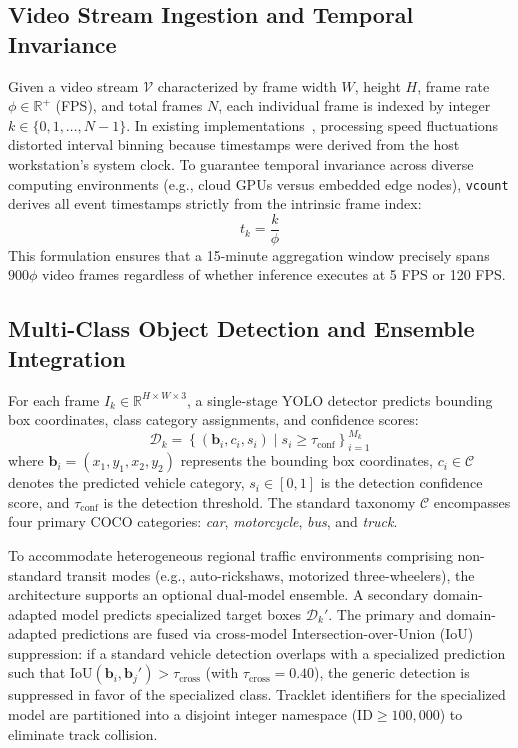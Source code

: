 \subsection{Video Stream Ingestion and Temporal Invariance}
Given a video stream $\mathcal{V}$ characterized by frame width $W$, height $H$, frame rate $\phi \in \mathbb{R}^+$ (FPS), and total frames $N$, each individual frame is indexed by integer $k \in \{0, 1, \dots, N-1\}$. In existing implementations~\cite{majumder2023automated}, processing speed fluctuations distorted interval binning because timestamps were derived from the host workstation's system clock. To guarantee temporal invariance across diverse computing environments (e.g., cloud GPUs versus embedded edge nodes), \texttt{vcount} derives all event timestamps strictly from the intrinsic frame index:
\begin{equation}
    t_k = \frac{k}{\phi}
    \label{eq:timestamp}
\end{equation}
This formulation ensures that a 15-minute aggregation window precisely spans $900\phi$ video frames regardless of whether inference executes at 5 FPS or 120 FPS.

\subsection{Multi-Class Object Detection and Ensemble Integration}
For each frame $I_k \in \mathbb{R}^{H \times W \times 3}$, a single-stage YOLO detector predicts bounding box coordinates, class category assignments, and confidence scores:
\begin{equation}
    \mathcal{D}_k = \left\{ \left(\mathbf{b}_i, c_i, s_i\right) \mid s_i \geq \tau_{\text{conf}} \right\}_{i=1}^{M_k}
\end{equation}
where $\mathbf{b}_i = (x_1, y_1, x_2, y_2)$ represents the bounding box coordinates, $c_i \in \mathcal{C}$ denotes the predicted vehicle category, $s_i \in [0, 1]$ is the detection confidence score, and $\tau_{\text{conf}}$ is the detection threshold. The standard taxonomy $\mathcal{C}$ encompasses four primary COCO categories: \textit{car}, \textit{motorcycle}, \textit{bus}, and \textit{truck}.

To accommodate heterogeneous regional traffic environments comprising non-standard transit modes (e.g., auto-rickshaws, motorized three-wheelers), the architecture supports an optional dual-model ensemble. A secondary domain-adapted model predicts specialized target boxes $\mathcal{D}_k'$. The primary and domain-adapted predictions are fused via cross-model Intersection-over-Union (IoU) suppression: if a standard vehicle detection overlaps with a specialized prediction such that $\text{IoU}(\mathbf{b}_i, \mathbf{b}_j') > \tau_{\text{cross}}$ (with $\tau_{\text{cross}} = 0.40$), the generic detection is suppressed in favor of the specialized class. Tracklet identifiers for the specialized model are partitioned into a disjoint integer namespace ($\text{ID} \ge 100{,}000$) to eliminate track collision.

